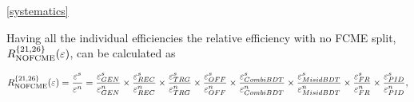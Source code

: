 \DIFaddbegin {}\autoref{systematics} 


\DIFaddend Having all the individual efficiencies the relative efficiency with no FCME split, $R_{\rm{NOFCME}}^{\{21,26\}}(\varepsilon)$, can be calculated as 


\hspace*{-1.0cm}\begin{equation}
	R_{\rm{NOFCME}}^{\{21,26\}}(\varepsilon)=\frac{\varepsilon^{s}}{\varepsilon^{n}}=\frac{\varepsilon_{GEN}^{s}}{\varepsilon_{GEN}^{n}} \times \frac{\varepsilon_{REC}^{s}}{\varepsilon_{REC}^{n}} \times \frac{\varepsilon_{TRG}^{s}}{\varepsilon_{TRG}^{n}} \times \frac{\varepsilon_{OFF}^{s}}{\varepsilon_{OFF}^{n}} \times \frac{\varepsilon_{CombiBDT}^{s}}{\varepsilon_{CombiBDT}^{n}} \times \frac{\varepsilon_{MisidBDT}^{s}}{\varepsilon_{MisidBDT}^{n}} \times \frac{\varepsilon_{FR}^{s}}{\varepsilon_{FR}^{n}} \times \frac{\varepsilon_{PID}^{s}}{\varepsilon_{PID}^{n}},
\label{eq:notsplitted}
\end{equation}


